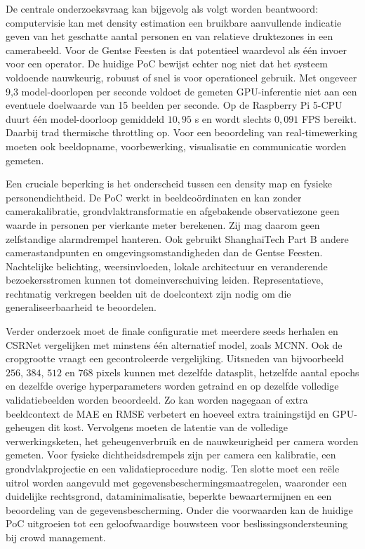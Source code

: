 De centrale onderzoeksvraag kan bijgevolg als volgt worden beantwoord: computervisie kan met density estimation een bruikbare aanvullende indicatie geven van het geschatte aantal personen en van relatieve druktezones in een camerabeeld. Voor de Gentse Feesten is dat potentieel waardevol als één invoer voor een operator. De huidige PoC bewijst echter nog niet dat het systeem voldoende nauwkeurig, robuust of snel is voor operationeel gebruik. Met ongeveer 9,3 model-doorlopen per seconde voldoet de gemeten GPU-inferentie niet aan een eventuele doelwaarde van 15 beelden per seconde. Op de Raspberry Pi 5-CPU duurt één model-doorloop gemiddeld \(10{,}95\) s en wordt slechts \(0{,}091\) FPS bereikt. Daarbij trad thermische throttling op. Voor een beoordeling van real-timewerking moeten ook beeldopname, voorbewerking, visualisatie en communicatie worden gemeten.

Een cruciale beperking is het onderscheid tussen een density map en fysieke personendichtheid. De PoC werkt in beeldcoördinaten en kan zonder camerakalibratie, grondvlaktransformatie en afgebakende observatiezone geen waarde in personen per vierkante meter berekenen. Zij mag daarom geen zelfstandige alarmdrempel hanteren. Ook gebruikt ShanghaiTech Part B andere camerastandpunten en omgevingsomstandigheden dan de Gentse Feesten. Nachtelijke belichting, weersinvloeden, lokale architectuur en veranderende bezoekersstromen kunnen tot domeinverschuiving leiden. Representatieve, rechtmatig verkregen beelden uit de doelcontext zijn nodig om die generaliseerbaarheid te beoordelen.

Verder onderzoek moet de finale configuratie met meerdere seeds herhalen en CSRNet vergelijken met minstens één alternatief model, zoals MCNN. Ook de cropgrootte vraagt een gecontroleerde vergelijking. Uitsneden van bijvoorbeeld \(256\), \(384\), \(512\) en \(768\) pixels kunnen met dezelfde datasplit, hetzelfde aantal epochs en dezelfde overige hyperparameters worden getraind en op dezelfde volledige validatiebeelden worden beoordeeld. Zo kan worden nagegaan of extra beeldcontext de MAE en RMSE verbetert en hoeveel extra trainingstijd en GPU-geheugen dit kost. Vervolgens moeten de latentie van de volledige verwerkingsketen, het geheugenverbruik en de nauwkeurigheid per camera worden gemeten. Voor fysieke dichtheidsdrempels zijn per camera een kalibratie, een grondvlakprojectie en een validatieprocedure nodig. Ten slotte moet een reële uitrol worden aangevuld met gegevensbeschermingsmaatregelen, waaronder een duidelijke rechtsgrond, dataminimalisatie, beperkte bewaartermijnen en een beoordeling van de gegevensbescherming. Onder die voorwaarden kan de huidige PoC uitgroeien tot een geloofwaardige bouwsteen voor beslissingsondersteuning bij crowd management.
